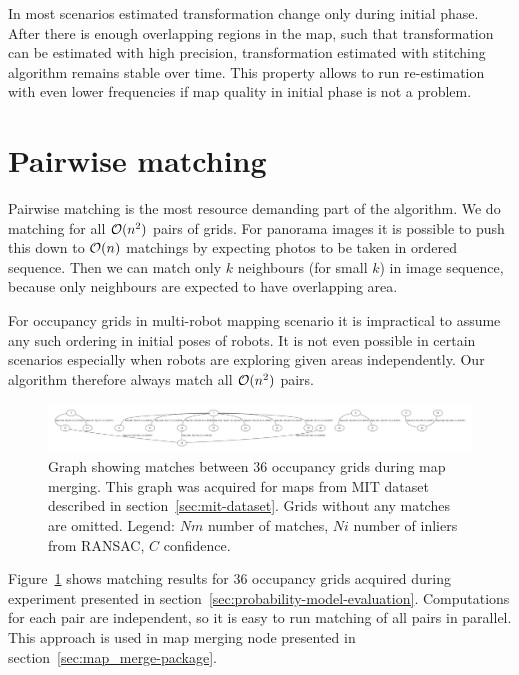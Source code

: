 In most scenarios estimated transformation change only during initial phase. After there is enough overlapping regions in the map, such that transformation can be estimated with high precision, transformation estimated with stitching algorithm remains stable over time. This property allows to run re-estimation with even lower frequencies if map quality in initial phase is not a problem.


\section{Pairwise matching} %
\label{sec:pairwisematching}

Pairwise matching is the most resource demanding part of the algorithm. We do matching for all $\operatorname{\mathcal{O}}(n^2)$ pairs of grids. For panorama images it is possible to push this down to $\operatorname{\mathcal{O}}(n)$ matchings by expecting photos to be taken in ordered sequence. Then we can match only $k$ neighbours (for small $k$) in image sequence, because only neighbours are expected to have overlapping area.

For occupancy grids in multi-robot mapping scenario it is impractical to assume any such ordering in initial poses of robots. It is not even possible in certain scenarios especially when robots are exploring given areas independently. Our algorithm therefore always match all $\operatorname{\mathcal{O}}(n^2)$ pairs.

\begin{figure}
    \centering
    \includegraphics[width=\textwidth]{../img/matches.pdf}
    \caption[Matches between occupancy grids during map merging.]{Graph showing matches between $36$ occupancy grids during map merging. This graph was acquired for maps from MIT dataset described in section~\ref{sec:mit-dataset}. Grids without any matches are omitted. Legend: $Nm$ number of matches, $Ni$ number of inliers from \gls{RANSAC}, $C$ confidence.}
    \label{fig:matches}
\end{figure}

Figure~\ref{fig:matches} shows matching results for $36$ occupancy grids acquired during experiment presented in section~\ref{sec:probability-model-evaluation}. Computations for each pair are independent, so it is easy to run matching of all pairs in parallel. This approach is used in map merging node presented in section~\ref{sec:map_merge-package}.

